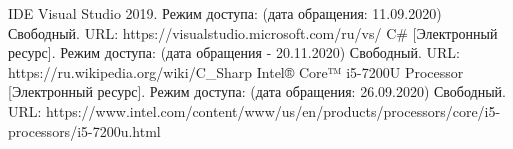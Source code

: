 %




	\begin{center}
	\begin{thebibliography}{3}
	IDE Visual Studio 2019. Режим доступа: (дата обращения: 11.09.2020) Свободный. URL: https://visualstudio.microsoft.com/ru/vs/
	C\# [Электронный ресурс]. Режим доступа: (дата обращения - 20.11.2020) Свободный. URL: https://ru.wikipedia.org/wiki/C\_Sharp	
	Intel® Core™ i5-7200U Processor [Электронный ресурс]. Режим доступа: (дата обращения: 26.09.2020) Свободный. URL: https://www.intel.com/content/www/us/en/products/processors/core/i5-processors/i5-7200u.html


	\end{thebibliography}
	\end{center}